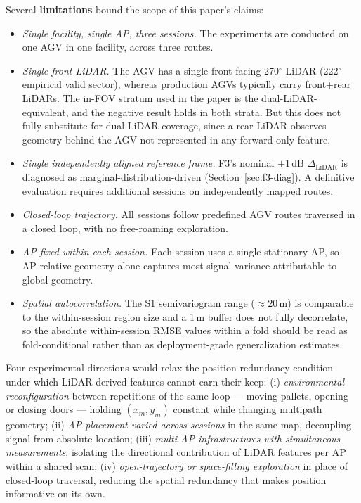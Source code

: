 \documentclass[conference]{IEEEtran}
\newcommand{\dB}{\,\mathrm{dB}}
\begin{document}
Several \textbf{limitations} bound the scope of this paper's claims:
\begin{itemize}
    \item \textit{Single facility, single AP, three sessions.} The experiments are conducted on one AGV in one facility, across three routes. 
    \item \textit{Single front LiDAR.} The AGV has a single front-facing 270$^{\circ}$ LiDAR (222$^{\circ}$ empirical valid sector), whereas production AGVs typically carry front+rear LiDARs. The in-FOV stratum used in the paper is the dual-LiDAR-equivalent, and the negative result holds in both strata. But this does not fully substitute for dual-LiDAR coverage, since a rear LiDAR observes geometry behind the AGV not represented in any forward-only feature.
    \item \textit{Single independently aligned reference frame.} F3's nominal $+1\dB$ $\Delta_\mathrm{LiDAR}$ is diagnosed as marginal-distribution-driven (Section~\ref{sec:f3-diag}). A definitive evaluation requires additional sessions on independently mapped routes.
    \item \textit{Closed-loop trajectory.} All sessions follow predefined AGV routes traversed in a closed loop, with no free-roaming exploration.
    \item \textit{AP fixed within each session.} Each session uses a single stationary AP, so AP-relative geometry alone captures most signal variance attributable to global geometry.
    \item \textit{Spatial autocorrelation.} The S1 semivariogram range ($\approx 20$\,m) is comparable to the within-session region size and a 1\,m buffer does not fully decorrelate, so the absolute within-session RMSE values within a fold should be read as fold-conditional rather than as deployment-grade generalization estimates. 
\end{itemize}

Four experimental directions would relax the position-redundancy condition under which LiDAR-derived features cannot earn their keep:
(i) \textit{environmental reconfiguration} between repetitions of the same loop --- moving pallets, opening or closing doors --- holding $(x_m, y_m)$ constant while changing multipath geometry;
(ii) \textit{AP placement varied across sessions} in the same map, decoupling signal from absolute location;
(iii) \textit{multi-AP infrastructures with simultaneous measurements}, isolating the directional contribution of LiDAR features per AP within a shared scan;
(iv) \textit{open-trajectory or space-filling exploration} in place of closed-loop traversal, reducing the spatial redundancy that makes position informative on its own.
\end{document}
